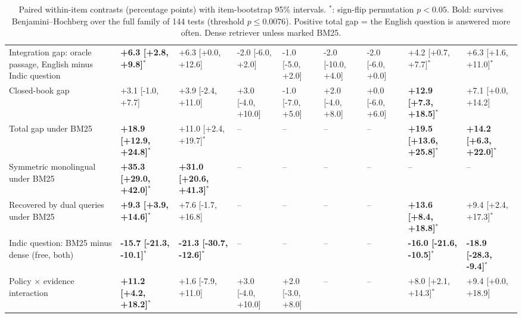\begin{table}[p]
{\begin{tabular}{p{5.6cm}llllllll}
Integration gap: oracle passage, English minus Indic question & \textbf{+6.3 [+2.8, +9.8]$^{*}$} & +6.3 [+0.0, +12.6] & -2.0 [-6.0, +2.0] & -1.0 [-5.0, +2.0] & -2.0 [-10.0, +4.0] & -2.0 [-6.0, +0.0] & +4.2 [+0.7, +7.7]$^{*}$ & +6.3 [+1.6, +11.0]$^{*}$ \\
Closed-book gap & +3.1 [-1.0, +7.7] & +3.9 [-2.4, +11.0] & +3.0 [-4.0, +10.0] & -1.0 [-7.0, +5.0] & +2.0 [-4.0, +8.0] & +0.0 [-6.0, +6.0] & \textbf{+12.9 [+7.3, +18.5]$^{*}$} & +7.1 [+0.0, +14.2] \\
Total gap under BM25 & \textbf{+18.9 [+12.9, +24.8]$^{*}$} & +11.0 [+2.4, +19.7]$^{*}$ & -- & -- & -- & -- & \textbf{+19.5 [+13.6, +25.8]$^{*}$} & \textbf{+14.2 [+6.3, +22.0]$^{*}$} \\
Symmetric monolingual under BM25 & \textbf{+35.3 [+29.0, +42.0]$^{*}$} & \textbf{+31.0 [+20.6, +41.3]$^{*}$} & -- & -- & -- & -- & -- & -- \\
Recovered by dual queries under BM25 & \textbf{+9.3 [+3.9, +14.6]$^{*}$} & +7.6 [-1.7, +16.8] & -- & -- & -- & -- & \textbf{+13.6 [+8.4, +18.8]$^{*}$} & +9.4 [+2.4, +17.3]$^{*}$ \\
Indic question: BM25 minus dense (free, both) & \textbf{-15.7 [-21.3, -10.1]$^{*}$} & \textbf{-21.3 [-30.7, -12.6]$^{*}$} & -- & -- & -- & -- & \textbf{-16.0 [-21.6, -10.5]$^{*}$} & \textbf{-18.9 [-28.3, -9.4]$^{*}$} \\
\midrule
Policy $\times$ evidence interaction & \textbf{+11.2 [+4.2, +18.2]$^{*}$} & +1.6 [-7.9, +11.0] & +3.0 [-4.0, +10.0] & +2.0 [-3.0, +8.0] & -- & -- & +8.0 [+2.1, +14.3]$^{*}$ & +9.4 [+0.0, +18.9] \\
\bottomrule
\end{tabular}}
\caption{Paired within-item contrasts (percentage points) with item-bootstrap 95\% intervals. $^{*}$: sign-flip permutation $p<0.05$. Bold: survives Benjamini--Hochberg over the full family of 144 tests (threshold $p \le 0.0076$). Positive total gap = the English question is answered more often. Dense retriever unless marked BM25.}
\label{tab:fullcontrasts}
\end{table}